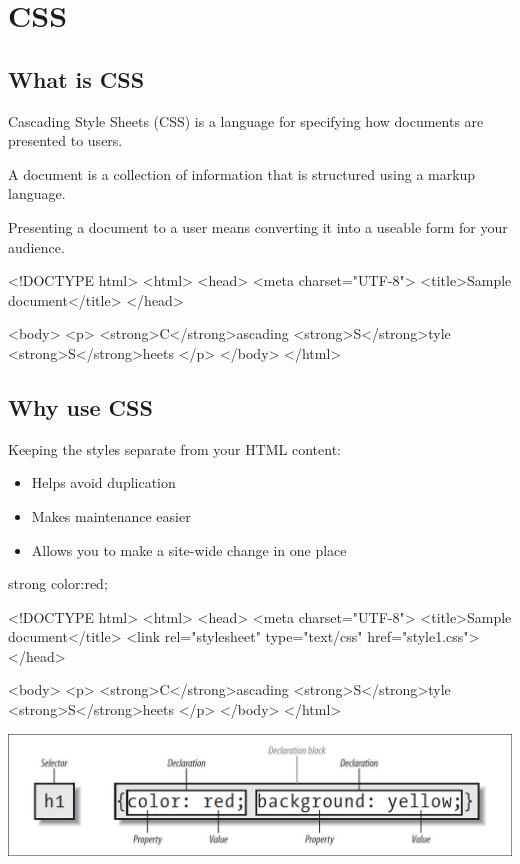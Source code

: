 \chapter{CSS}

\section{What is CSS}

Cascading Style Sheets (CSS) is a language for specifying how documents are presented to users.

A document is a collection of information that is structured using a markup language.

Presenting a document to a user means converting it into a useable form for your audience.

\begin{HTML5}[demo]
<!DOCTYPE html>
<html>
  <head>
  <meta charset="UTF-8">
  <title>Sample document</title>
  </head>

  <body>
    <p>
      <strong>C</strong>ascading
      <strong>S</strong>tyle
      <strong>S</strong>heets
    </p>
  </body>
</html>
\end{HTML5}

\section{Why use CSS}

Keeping the styles separate from your HTML content:
\begin{itemize}
\item Helps avoid duplication
\item Makes maintenance easier
\item Allows you to make a site-wide change in one place
\end{itemize}


\begin{CSS}
strong {color:red;}
\end{CSS}

\begin{HTML5}
<!DOCTYPE html>
<html>
  <head>
  <meta charset="UTF-8">
  <title>Sample document</title>
  <link rel="stylesheet" type="text/css" href="style1.css">
  </head>

  <body>
    <p>
      <strong>C</strong>ascading
      <strong>S</strong>tyle
      <strong>S</strong>heets
    </p>
  </body>
</html>
\end{HTML5}

\includegraphics[scale=0.75]{css/resources/css-rule.jpg}

